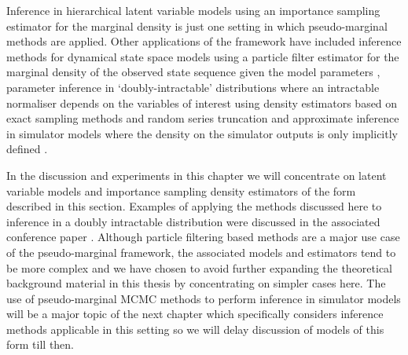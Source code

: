 Inference in hierarchical latent variable models using an importance sampling estimator for the marginal density is just one setting in which pseudo-marginal methods are applied. Other applications of the framework have included inference methods for dynamical state space models using a particle filter estimator \citep{doucet2001sequential,gordon1993novel} for the marginal density of the observed state sequence given the model parameters \citep{pitt2010auxiliary,chopin2015particle,andrieu2010particle}, parameter inference in `doubly-intractable' distributions \citep{murray2006mcmc} where an intractable normaliser depends on the variables of interest using density estimators based on exact sampling methods \citep{propp1996exact,moller2006efficient,murray2007advances} and random series truncation \citep{lyne2015russian} and approximate inference in simulator models where the density on the simulator outputs is only implicitly defined \citep{marjoram2003markov}. 

In the discussion and experiments in this chapter we will concentrate on latent variable models and importance sampling density estimators of the form described in this section. Examples of applying the methods discussed here to inference in a doubly intractable distribution were discussed in the associated conference paper \citep{murray2016pseudo}. Although particle filtering based methods are a major use case of the pseudo-marginal framework, the associated models and estimators tend to be more complex and we have chosen to avoid further expanding the theoretical background material in this thesis by concentrating on simpler cases here. The use of pseudo-marginal \ac{MCMC} methods to perform inference in simulator models will be a major topic of the next chapter which specifically considers inference methods applicable in this setting so we will delay discussion of models of this form till then.

